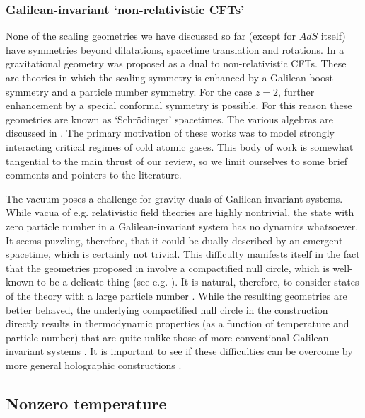 \documentclass[10pt, oneside]{book}
\begin{document}
\begin{doublespace}
\subsubsection{Galilean-invariant `non-relativistic CFTs'}

None of the scaling geometries we have discussed so far (except for $AdS$ itself) have symmetries beyond dilatations, spacetime translation and rotations. In \cite{Son:2008ye, Balasubramanian:2008dm} a gravitational geometry was proposed as a dual to non-relativistic CFTs. These are theories in which the scaling symmetry is enhanced by a Galilean boost symmetry and a particle number symmetry. For the case $z=2$, further enhancement by a special conformal symmetry is possible. For this reason these geometries are known as `Schr\"odinger' spacetimes. The various algebras are discussed in \cite{Hartnoll:2009sz}. The primary motivation of these works was to model strongly interacting critical regimes of cold atomic gases. This body of work is somewhat tangential to the main thrust of our review, so we limit ourselves to some brief comments and pointers to the literature. 

The vacuum poses a challenge for gravity duals of Galilean-invariant systems. While vacua of e.g. relativistic field theories are highly nontrivial, the state with zero particle number in a Galilean-invariant system has no dynamics whatsoever. It seems puzzling, therefore, that it could be dually described by an emergent spacetime, which is certainly not trivial. This difficulty manifests itself in the fact that the geometries proposed in \cite{Son:2008ye, Balasubramanian:2008dm} involve a compactified null circle, which is well-known to be a delicate thing (see e.g. \cite{Maldacena:2008wh}). It is natural, therefore, to consider states of the theory with a large particle number \cite{Maldacena:2008wh, Herzog:2008wg, Adams:2008wt, Kovtun:2008qy}. While the resulting geometries are better behaved, the underlying compactified null circle in the construction directly results in thermodynamic properties (as a function of temperature and particle number) that are quite unlike those of more conventional Galilean-invariant systems \cite{Maldacena:2008wh}. It is important to see if these difficulties can be overcome by more general holographic constructions \cite{Balasubramanian:2010uw, Janiszewski:2012nb}.

\subsection{Nonzero temperature}
\label{sec:temp}


\end{doublespace}
\end{document}

